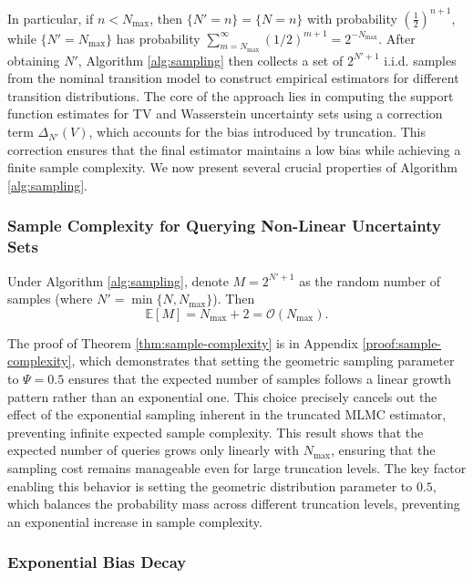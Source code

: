 In particular, if $n<N_{\max}$, then $\{N'=n\}=\{N=n\}$ with probability $(\tfrac12)^{n+1}$, while $\{N'=N_{\max}\}$ has probability $\sum_{m=N_{\max}}^\infty (1/2)^{m+1} = 2^{-N_{\max}}$. After obtaining $N'$, Algorithm \ref{alg:sampling} then collects a set of $2^{N'+1}$ i.i.d. samples from the nominal transition model to construct empirical estimators for different transition distributions. The core of the approach lies in computing the support function estimates for TV and Wasserstein uncertainty sets using a correction term $\Delta_{N'}(V)$, which accounts for the bias introduced by truncation. This correction ensures that the final estimator maintains a low bias while achieving a finite sample complexity. We now present several crucial properties of Algorithm \ref{alg:sampling}.


\subsubsection{Sample Complexity for Querying Non-Linear Uncertainty Sets}

\begin{theorem}
\label{thm:sample-complexity}
Under Algorithm \ref{alg:sampling}, denote $M = 2^{N'+1}$
as the random number of samples (where $N'=\min\{N,N_{\max}\}$).  Then
\begin{equation}
\mathbb{E}[M]=N_{\max}+2=\mathcal{O}(N_{\max}).
\end{equation}
\end{theorem}
The proof of Theorem \ref{thm:sample-complexity} is in Appendix \ref{proof:sample-complexity}, which demonstrates that setting the geometric sampling parameter to $\Psi=0.5$  ensures that the expected number of samples follows a linear growth pattern rather than an exponential one. This choice precisely cancels out the effect of the exponential sampling inherent in the truncated MLMC estimator, preventing infinite expected sample complexity. This result shows that the expected number of queries grows only linearly with $N_{\max}$, ensuring that the sampling cost remains manageable even for large truncation levels. The key factor enabling this behavior is setting the geometric distribution parameter to $0.5,$ which balances the probability mass across different truncation levels, preventing an exponential increase in sample complexity.


\subsubsection{Exponential Bias Decay}

